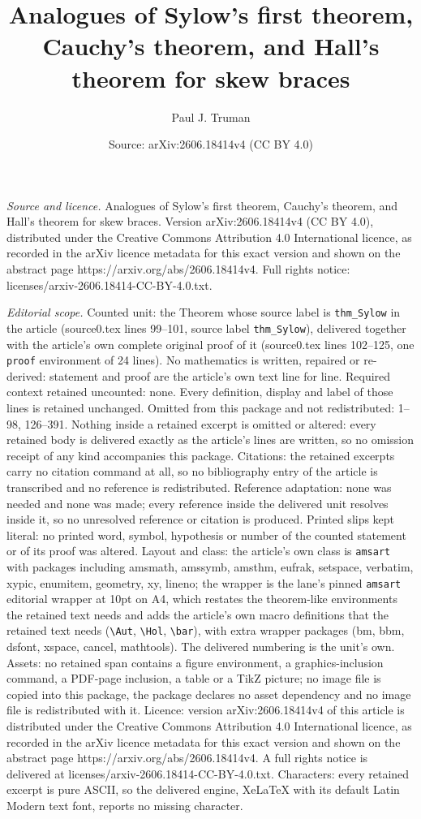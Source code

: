 \documentclass[10pt,a4paper]{amsart}
\title[Analogues of Sylow's first theorem, Cauchy's theorem, and Ha]{Analogues of Sylow's first theorem, Cauchy's theorem, and Hall's theorem for skew braces}
\author{Paul J. Truman}
\date{Source: arXiv:2606.18414v4 (CC BY 4.0)}
\begin{document}
\maketitle

\noindent\emph{Source and licence.} Analogues of Sylow's first theorem, Cauchy's theorem, and Hall's theorem for skew braces. Version arXiv:2606.18414v4 (CC BY 4.0), distributed under the Creative Commons Attribution 4.0 International licence, as recorded in the arXiv licence metadata for this exact version and shown on the abstract page https://arxiv.org/abs/2606.18414v4. Full rights notice: licenses/arxiv-2606.18414-CC-BY-4.0.txt.\par\smallskip

\noindent\textit{Editorial scope.} Counted unit: the Theorem whose source label is \texttt{thm\_Sylow} in the article (source0.tex lines 99--101, source label \texttt{thm\_Sylow}), delivered together with the article's own complete original proof of it (source0.tex lines 102--125, one \texttt{proof} environment of 24 lines). No mathematics is written, repaired or re-derived: statement and proof are the article's own text line for line. Required context retained uncounted: none. Every definition, display and label of those lines is retained unchanged. Omitted from this package and not redistributed: 1--98, 126--391. Nothing inside a retained excerpt is omitted or altered: every retained body is delivered exactly as the article's lines are written, so no omission receipt of any kind accompanies this package. Citations: the retained excerpts carry no citation command at all, so no bibliography entry of the article is transcribed and no reference is redistributed. Reference adaptation: none was needed and none was made; every reference inside the delivered unit resolves inside it, so no unresolved reference or citation is produced. Printed slips kept literal: no printed word, symbol, hypothesis or number of the counted statement or of its proof was altered. Layout and class: the article's own class is \texttt{amsart} with packages including amsmath, amssymb, amsthm, eufrak, setspace, verbatim, xypic, enumitem, geometry, xy, lineno; the wrapper is the lane's pinned \texttt{amsart} editorial wrapper at 10pt on A4, which restates the theorem-like environments the retained text needs and adds the article's own macro definitions that the retained text needs (\texttt{\textbackslash Aut}, \texttt{\textbackslash Hol}, \texttt{\textbackslash bar}), with extra wrapper packages (bm, bbm, dsfont, xspace, cancel, mathtools). The delivered numbering is the unit's own. Assets: no retained span contains a figure environment, a graphics-inclusion command, a PDF-page inclusion, a table or a TikZ picture; no image file is copied into this package, the package declares no asset dependency and no image file is redistributed with it. Licence: version arXiv:2606.18414v4 of this article is distributed under the Creative Commons Attribution 4.0 International licence, as recorded in the arXiv licence metadata for this exact version and shown on the abstract page https://arxiv.org/abs/2606.18414v4. A full rights notice is delivered at licenses/arxiv-2606.18414-CC-BY-4.0.txt. Characters: every retained excerpt is pure ASCII, so the delivered engine, XeLaTeX with its default Latin Modern text font, reports no missing character.
\end{document}
